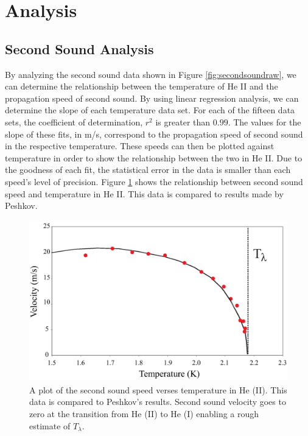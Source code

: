 
\section{Analysis}\label{analysis}
\subsection{Second Sound Analysis}\label{analysis}

By analyzing the second sound data shown in Figure \ref{fig:secondsoundraw}, we can determine the relationship between the temperature of He II and the propagation speed of second sound.  By using linear regression analysis, we can determine the slope of each temperature data set.  For each of the fifteen data sets, the coefficient of determination, $r^{2}$ is greater than $0.99$.  The values for the slope of these fits, in m/s, correspond to the propagation speed of second sound in the respective temperature.  These speeds can then be plotted against temperature in order to show the relationship between the two in He II.  Due to the goodness of each fit, the statistical error in the data is smaller than each speed's level of precision. Figure \ref{fig:secondsound} shows the relationship between second sound speed and temperature in He II.  This data is compared to results made by Peshkov.\cite{peshkov}

\begin{figure}[htbp]
\begin{center}
\includegraphics[height=70mm]{./figures/secondsound.eps}
\caption{\small{A plot of the second sound speed verses temperature in He (II).  This data is compared to Peshkov's results.\cite{peshkov} Second sound velocity goes to zero at the transition from He (II) to He (I) enabling a rough estimate of $T_{\lambda}$.}}
\label{fig:secondsound}
\end{center}
\end{figure}


